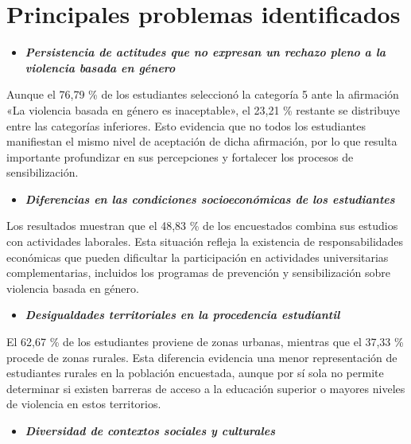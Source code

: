 \documentclass[
  spanish,
  11pt,
  letterpaper,
  DIV=11,
  numbers=noendperiod]{scrreprt}
\providecommand{\tightlist}{%
  \setlength{\itemsep}{0pt}\setlength{\parskip}{0pt}}
\begin{document}
\section{Principales problemas
identificados}\label{principales-problemas-identificados}

\begin{itemize}
\tightlist
\item
  \textbf{\emph{Persistencia de actitudes que no expresan un rechazo
  pleno a la violencia basada en género}}
\end{itemize}

Aunque el 76,79 \% de los estudiantes seleccionó la categoría 5 ante la
afirmación «La violencia basada en género es inaceptable», el 23,21 \%
restante se distribuye entre las categorías inferiores. Esto evidencia
que no todos los estudiantes manifiestan el mismo nivel de aceptación de
dicha afirmación, por lo que resulta importante profundizar en sus
percepciones y fortalecer los procesos de sensibilización.

\begin{itemize}
\tightlist
\item
  \textbf{\emph{Diferencias en las condiciones socioeconómicas de los
  estudiantes}}
\end{itemize}

Los resultados muestran que el 48,83 \% de los encuestados combina sus
estudios con actividades laborales. Esta situación refleja la existencia
de responsabilidades económicas que pueden dificultar la participación
en actividades universitarias complementarias, incluidos los programas
de prevención y sensibilización sobre violencia basada en género.

\begin{itemize}
\tightlist
\item
  \textbf{\emph{Desigualdades territoriales en la procedencia
  estudiantil}}
\end{itemize}

El 62,67 \% de los estudiantes proviene de zonas urbanas, mientras que
el 37,33 \% procede de zonas rurales. Esta diferencia evidencia una
menor representación de estudiantes rurales en la población encuestada,
aunque por sí sola no permite determinar si existen barreras de acceso a
la educación superior o mayores niveles de violencia en estos
territorios.

\begin{itemize}
\tightlist
\item
  \textbf{\emph{Diversidad de contextos sociales y culturales}}
\end{itemize}
\end{document}
